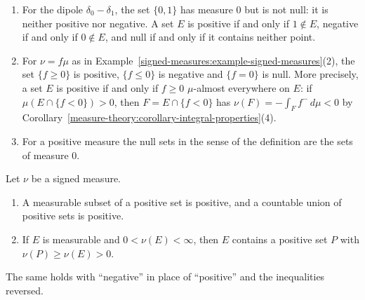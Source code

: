 \begin{example}\label{signed-measures:example-positive-sets}
\begin{enumerate}
\item For the dipole $\delta_0 - \delta_1$, the set $\{0, 1\}$ has measure $0$ but is not null: it is neither positive nor negative. A set $E$ is positive if and only if $1 \notin E$, negative if and only if
$0 \notin E$, and null if and only if it contains neither point.
\item For $\nu = f\mu$ as in Example~\ref{signed-measures:example-signed-measures}(2), the set $\{f \geq 0\}$ is positive, $\{f \leq 0\}$ is negative and $\{f = 0\}$ is null. More precisely, a set $E$ is
positive if and only if $f \geq 0$ $\mu$-almost everywhere on $E$: if $\mu(E \cap \{f < 0\}) > 0$, then $F = E \cap \{f < 0\}$ has $\nu(F) = -\int_Ff^-\,d\mu < 0$ by
Corollary~\ref{measure-theory:corollary-integral-properties}(4).
\item For a positive measure the null sets in the sense of the definition are the sets of measure $0$.
\end{enumerate}
\end{example}

\begin{lemma}\label{signed-measures:lemma-positive-sets}
Let $\nu$ be a signed measure.
\begin{enumerate}
\item A measurable subset of a positive set is positive, and a countable union of positive sets is positive.
\item If $E$ is measurable and $0 < \nu(E) < \infty$, then $E$ contains a positive set $P$ with $\nu(P) \geq \nu(E) > 0$.
\end{enumerate}
The same holds with ``negative'' in place of ``positive'' and the inequalities reversed.
\end{lemma}

